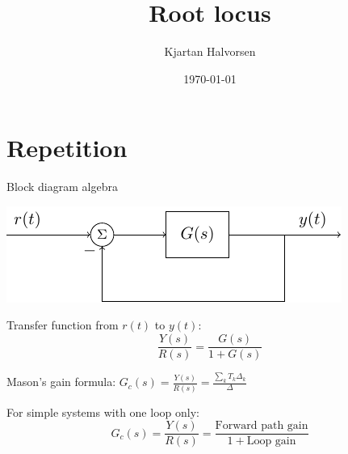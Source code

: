 \documentclass[presentation,aspectratio=169, usenames, dvipsnames]{beamer}
\author{Kjartan Halvorsen}
\date{\today}
\title{Root locus}
\begin{document}
\maketitle


\section{Repetition}
\label{sec:org1a1505a}
\begin{frame}[label={sec:org8fc1eb3}]{Block diagram algebra}
\begin{center}
  \includegraphics[width=.6\linewidth]{../../figures/block-simple-feedback}
\end{center}

Transfer function from \(r(t)\) to \(y(t)\):
\[ \frac{Y(s)}{R(s)} = \frac{G(s)}{ 1+ G(s)}\]

\pause
\alert{Mason's} gain formula: \(G_c(s) = \frac{Y(s)}{R(s)} = \frac{\sum_k T_k\Delta_k}{\Delta}\)

For simple systems with one loop only: \[G_c(s) = \frac{Y(s)}{R(s)} = \frac{\text{Forward path gain}}{1+\text{Loop gain}}\]
\end{frame}
\end{document}
